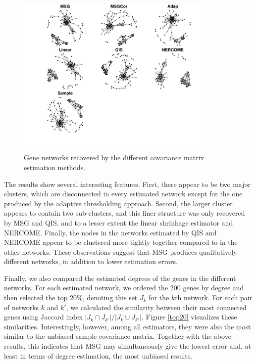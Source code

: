 \documentclass[useAMS,referee,usenatbib]{biom}
\begin{document}
\begin{figure}
\begin{center}
\centerline{ \includegraphics[width=0.85\textwidth]{img/network.pdf}}
\end{center}
\caption{Gene networks recovered by the different covariance matrix estimation methods.}
\label{network}
\end{figure}

The results show several interesting features. First, there appear to be two major clusters, which are disconnected in every estimated network except for the one produced by the adaptive thresholding approach. Second, the larger cluster appears to contain two sub-clusters, and this finer structure was only recovered by MSG and QIS, and to a lesser extent the linear shrinkage estimator and NERCOME. Finally, the nodes in the networks estimated by QIS and NERCOME appear to be clustered more tightly together compared to in the other networks. These observations suggest that MSG produces qualitatively different networks, in addition to lower estimation errors.

Finally, we also compared the estimated degrees of the genes in the different networks. For each estimated network, we ordered the 200 genes by degree and then selected the top 20\%, denoting this set $J_k$ for the $k$th network. For each pair of networks $k$ and $k'$, we calculated the similarity between their most connected genes using Jaccard index $\vert J_k \cap J_{k'} \vert / \vert J_k \cup J_{k'} \vert$. Figure \ref{top20} visualizes these similarities. Interestingly, however, among all estimators, they were also the most similar to the unbiased sample covariance matrix. Together with the above results, this indicates that MSG may simultaneously give the lowest error and, at least in terms of degree estimation, the most unbiased results.
\end{document}
